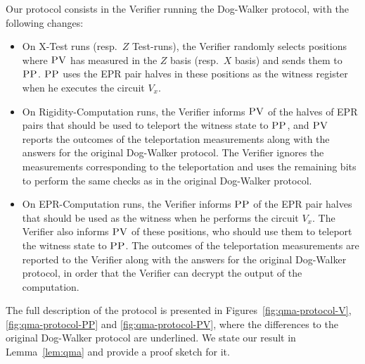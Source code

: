 Our protocol consists in the Verifier running the Dog-Walker protocol,
  with the following changes:
  \begin{itemize}
    \item On X-Test runs (resp.\ $Z$ Test-runs), the Verifier randomly selects  positions where
      $\textsc{PV}$ has measured in the $Z$ basis (resp.\ $X$ basis) and sends them to $\textsc{PP}$. $\textsc{PP}$ uses the EPR pair halves in these positions as the witness register when he executes the circuit $V_x$.
    \item On Rigidity-Computation runs, the Verifier
      informs $\textsc{PV}$ of the halves of EPR pairs that should be used to teleport the witness
      state to $\textsc{PP}$, and $\textsc{PV}$ reports the outcomes of the teleportation
      measurements along with the answers for the original Dog-Walker protocol. The Verifier ignores the measurements corresponding to the teleportation and uses the remaining bits to perform the same checks as in the original Dog-Walker protocol.
      \item On EPR-Computation runs, the Verifier informs $\textsc{PP}$ of the
      EPR pair halves that should be used as the witness when he performs the circuit $V_x$.  
      The Verifier
      also informs $\textsc{PV}$ of these positions, who should use them to teleport the witness
      state to $\textsc{PP}$.  The outcomes of the teleportation      measurements are reported to the Verifier along with the answers for the original Dog-Walker protocol, in order that the Verifier can decrypt the output of the computation.
  \end{itemize}

The full description of the protocol is presented in Figures~\ref{fig:qma-protocol-V}, \ref{fig:qma-protocol-PP} and \ref{fig:qma-protocol-PV}, where the differences to the original Dog-Walker protocol are underlined. We state our result in Lemma~\ref{lem:qma} and provide a proof sketch for it. 


